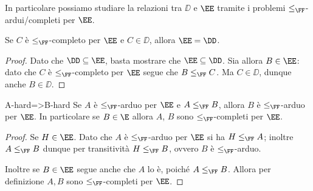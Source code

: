 In particolare possiamo studiare la relazioni tra $\DD$ e $\EE$ tramite i problemi $\leq_{\FF}$-ardui/completi per $\EE$.

\begin{proposition}
    {}{}
    Se $C$ è $\leq_{\FF}$-completo per $\EE$ e $C \in \DD$, allora $\EE = \DD$.    
\end{proposition}
\begin{proof}
    Dato che $\DD \subseteq \EE$, basta mostrare che $\EE \subseteq \DD$. Sia allora $B \in \EE$: dato che $C$ è $\leq_{\FF}$-completo per $\EE$ segue che $B \leq_{\FF} C$. Ma $C \in \DD$, dunque anche $B \in \DD$.      
\end{proof}

\begin{proposition}{}{A-hard=>B-hard}
    Se $A$ è $\leq_{\FF}$-arduo per $\EE$ e $A \leq_{\FF} B$, allora $B$ è $\leq_{\FF}$-arduo per $\EE$. In particolare se $B \in \E$ allora $A$, $B$ sono $\leq_{\FF}$-completi per $\EE$.          
\end{proposition}
\begin{proof}
    Se $H \in \EE$. Dato che $A$ è $\leq_{\FF}$-arduo per $\EE$ si ha $H \leq_{\FF} A$; inoltre $A \leq_{\FF} B$ dunque per transitività $H \leq_{\FF} B$, ovvero $B$ è $\leq_{\FF}$-arduo.
    
    Inoltre se $B \in \EE$ segue anche che $A$ lo è, poiché $A \leq_{\FF} B$. Allora per definizione $A, B$ sono $\leq_{\FF}$-completi per $\EE$.
\end{proof}